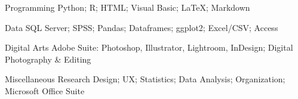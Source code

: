 \vspace{-0.5em}


\begin{cvskills}


\cvskill
{Programming} %
{Python; R; HTML; Visual Basic; LaTeX; Markdown} %


\cvskill
{Data} %
{SQL Server; SPSS; Pandas; Dataframes; ggplot2; Excel/CSV; Access}


\cvskill
{Digital Arts} %
{Adobe Suite: Photoshop, Illustrator, Lightroom, InDesign; Digital Photography \& Editing}



\cvskill
{Miscellaneous} %
{Research Design; UX; Statistics; Data Analysis; Organization; Microsoft Office Suite}


\end{cvskills}